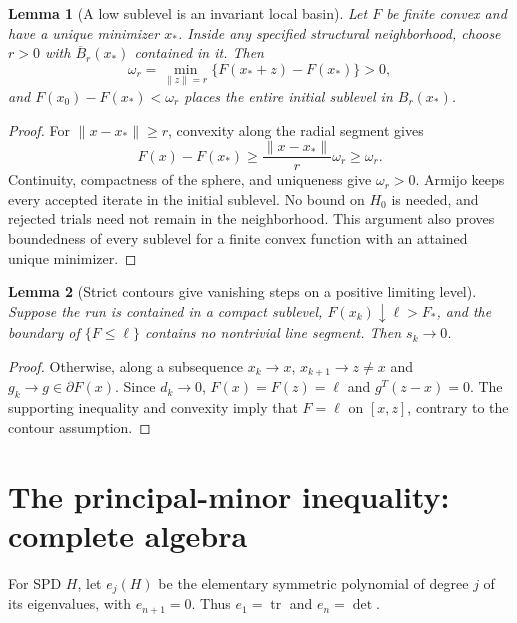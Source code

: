 \documentclass[10pt,oneside,openany]{book}
\newtheorem{lemma}{Lemma}[chapter]
\theoremstyle{remark}\newtheorem{remark}{Remark}[chapter]
\begin{document}
\begin{lemma}[A low sublevel is an invariant local basin]\label{M:localization}
Let $F$ be finite convex and have a unique minimizer $x_*$. Inside any specified structural neighborhood, choose $r>0$ with $\overline B_r(x_*)$ contained in it. Then
\[
 \omega_r=\min_{\|z\|=r}\{F(x_*+z)-F(x_*)\}>0,
\]
and $F(x_0)-F(x_*)<\omega_r$ places the entire initial sublevel in $B_r(x_*)$.
\end{lemma}
\begin{proof}
For $\|x-x_*\|\ge r$, convexity along the radial segment gives
\[
 F(x)-F(x_*)\ge\frac{\|x-x_*\|}{r}\omega_r\ge\omega_r.
\]
Continuity, compactness of the sphere, and uniqueness give $\omega_r>0$. Armijo keeps every accepted iterate in the initial sublevel. No bound on $H_0$ is needed, and rejected trials need not remain in the neighborhood. This argument also proves boundedness of every sublevel for a finite convex function with an attained unique minimizer.
\end{proof}

\begin{lemma}[Strict contours give vanishing steps on a positive limiting level]\label{M:strictcontours}
Suppose the run is contained in a compact sublevel, $F(x_k)\downarrow\ell>F_*$, and the boundary of $\{F\le\ell\}$ contains no nontrivial line segment. Then $s_k\to0$.
\end{lemma}
\begin{proof}
Otherwise, along a subsequence $x_k\to x$, $x_{k+1}\to z\ne x$ and $g_k\to g\in\partial F(x)$. Since $d_k\to0$, $F(x)=F(z)=\ell$ and $g^T(z-x)=0$. The supporting inequality and convexity imply that $F=\ell$ on $[x,z]$, contrary to the contour assumption.
\end{proof}

\section{The principal-minor inequality: complete algebra}
\label{M:principal}
For SPD $H$, let $e_j(H)$ be the elementary symmetric polynomial of degree $j$ of its eigenvalues, with $e_{n+1}=0$. Thus $e_1=\operatorname{tr}$ and $e_n=\det$.
\end{document}
